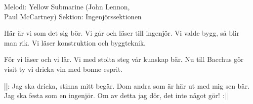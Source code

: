 \begin{song}

\begin{songmeta}
Melodi: Yellow Submarine (John Lennon, \\Paul McCartney)
Sektion: Ingenjörssektionen
\end{songmeta}

\begin{songtext}
Här är vi som det sig bör.
Vi går och läser till ingenjör.
Vi valde bygg, så blir man rik.
Vi läser konstruktion och byggteknik.

För vi läser och vi lär.
Vi med stolta steg vår kunskap bär.
Nu till Bacchus gör visit
ty vi dricka vin med bonne esprit.

||: Jag ska dricka, stinna mitt begär.
Dom andra som är här
ut med mig sen bär.
Jag ska festa som en ingenjör.
Om av detta jag dör,
det inte något gör! :||
\end{songtext}
\end{song}
